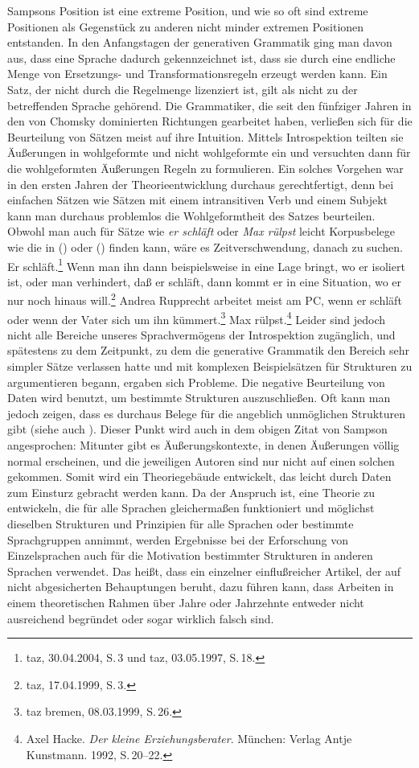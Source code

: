 Sampsons Position ist eine extreme Position, und wie so oft sind extreme Positionen als Gegenstück
zu anderen nicht minder extremen Positionen entstanden. In den Anfangstagen der generativen Grammatik ging man davon aus,
dass eine Sprache dadurch gekennzeichnet ist, dass sie durch eine endliche Menge von Ersetzungs- und
Transformationsregeln erzeugt werden kann. Ein Satz, der nicht durch die Regelmenge lizenziert ist,
gilt als nicht zu der betreffenden Sprache gehörend. Die Grammatiker, die
seit den fünfziger Jahren in den von Chomsky dominierten Richtungen gearbeitet haben, verließen
sich für die Beurteilung von Sätzen meist auf ihre Intuition. Mittels Introspektion teilten sie
Äußerungen in wohlgeformte und nicht wohlgeformte ein und versuchten dann für die wohlgeformten
Äußerungen Regeln zu formulieren. Ein solches Vorgehen war in den ersten Jahren der Theorieentwicklung
durchaus gerechtfertigt, denn bei einfachen Sätzen wie \zb Sätzen mit einem intransitiven Verb
und einem Subjekt kann man durchaus problemlos die Wohlgeformtheit des Satzes beurteilen.
Obwohl man auch für Sätze wie \emph{er schläft} oder \emph{Max rülpst} leicht Korpusbelege
wie die in () oder () finden kann, wäre es Zeitverschwendung, danach zu suchen.
\eal
\ex Er schläft.\footnote{
  taz, 30.04.2004, S.\,3 und taz, 03.05.1997, S.\,18.
}
\ex Wenn man ihn dann beispielsweise in eine Lage bringt, wo er isoliert ist, oder man verhindert, 
    daß er schläft, dann kommt er in eine Situation, wo er nur noch hinaus will.\footnote{
  taz, 17.04.1999, S.\,3.
}
\ex Andrea Rupprecht arbeitet meist am PC, wenn er schläft oder wenn der Vater sich um ihn kümmert.\footnote{
  taz bremen,  08.03.1999, S.\,26.
}
\zl
\ea
Max rülpst.\footnote{
  Axel Hacke. \emph{Der kleine Erziehungsberater}. München: Verlag Antje Kunstmann. 1992, S.\,20--22.%
}
\z
Leider sind jedoch nicht alle Bereiche unseres Sprachvermögens der Introspektion zugänglich, und
spätestens zu dem Zeitpunkt, zu dem die generative Grammatik den Bereich sehr simpler Sätze verlassen
hatte und mit komplexen Beispielsätzen für Strukturen zu argumentieren begann, ergaben sich Probleme.
Die negative Beurteilung von Daten wird benutzt, um bestimmte Strukturen auszuschließen. Oft kann man
jedoch zeigen, dass es durchaus Belege für die angeblich unmöglichen Strukturen gibt (siehe auch ).
Dieser Punkt wird auch in dem obigen Zitat von Sampson angesprochen: Mitunter gibt es Äußerungskontexte, in denen
Äußerungen völlig normal erscheinen, und die jeweiligen Autoren sind nur nicht auf einen solchen gekommen.
Somit wird ein Theoriegebäude entwickelt, das leicht durch Daten zum Einsturz gebracht werden kann.
Da der Anspruch ist, eine Theorie zu entwickeln, die für alle Sprachen gleichermaßen funktioniert
und möglichst dieselben Strukturen und Prinzipien für alle Sprachen oder bestimmte Sprachgruppen
annimmt, werden Ergebnisse bei der Erforschung von Einzelsprachen auch für die Motivation
bestimmter Strukturen in anderen Sprachen verwendet. Das heißt, dass ein einzelner einflußreicher
Artikel, der auf nicht abgesicherten Behauptungen beruht, dazu führen kann, dass Arbeiten
in einem theoretischen Rahmen über Jahre oder Jahrzehnte entweder nicht ausreichend begründet 
oder sogar wirklich falsch sind.

